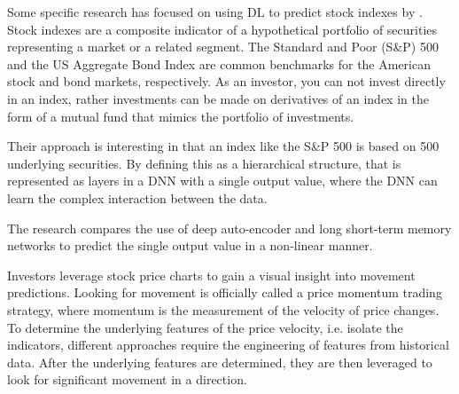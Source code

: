 \documentclass[11pt]{article}
\begin{document}
Some specific research has focused on using DL to predict stock indexes by \citet{Heaton2016DeepFinance}. Stock indexes are a composite indicator of a hypothetical portfolio of securities representing a market or a related segment. The Standard and Poor (S\&P) 500 and the US Aggregate Bond Index are common benchmarks for the American stock and bond markets, respectively. As an investor, you can not invest directly in an index, rather investments can be made on derivatives of an index in the form of a mutual fund that mimics the portfolio of investments.

Their approach is interesting in that an index like the S\&P 500 is based on 500 underlying securities. By defining this as a hierarchical structure, that is represented as layers in a DNN with a single output value, where the DNN can learn the complex interaction between the data.

The research compares the use of deep auto-encoder and long short-term memory networks to predict the single output value in a non-linear manner.

Investors leverage stock price charts to gain a visual insight into movement predictions. Looking for movement is officially called a price momentum trading strategy, where momentum is the measurement of the velocity of price changes. To determine the underlying features of the price velocity, i.e. isolate the indicators, different approaches require the engineering of features from historical data. After the underlying features are determined, they are then leveraged to look for significant movement in a direction.
\end{document}
